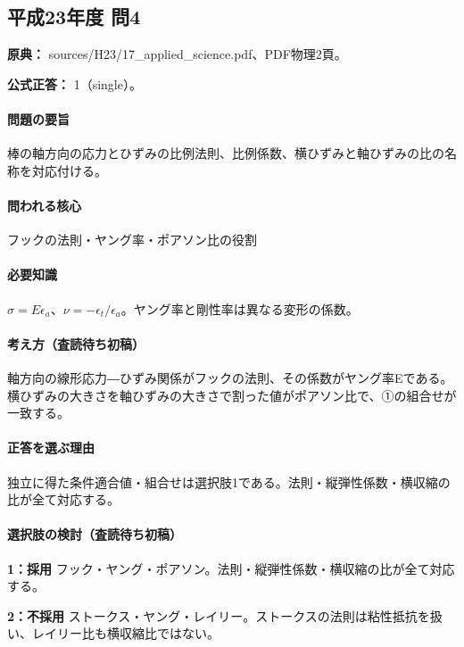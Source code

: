 \subsection{平成23年度 問4}
\label{q:h23-reg-applied-04}

\noindent\textbf{原典：} sources/H23/17\_applied\_science.pdf、PDF物理2頁。

\textbf{公式正答：} 1（single）。

\paragraph{問題の要旨} 棒の軸方向の応力とひずみの比例法則、比例係数、横ひずみと軸ひずみの比の名称を対応付ける。

\paragraph{問われる核心} フックの法則・ヤング率・ポアソン比の役割

\paragraph{必要知識} \(\sigma=E\epsilon_a\)、\(\nu=-\epsilon_t/\epsilon_a\)。ヤング率と剛性率は異なる変形の係数。

\paragraph{考え方（査読待ち初稿）} 軸方向の線形応力―ひずみ関係がフックの法則、その係数がヤング率Eである。横ひずみの大きさを軸ひずみの大きさで割った値がポアソン比で、①の組合せが一致する。

\paragraph{正答を選ぶ理由} 独立に得た条件適合値・組合せは選択肢1である。法則・縦弾性係数・横収縮の比が全て対応する。

\paragraph{選択肢の検討（査読待ち初稿）}

\noindent\textbf{1：採用} フック・ヤング・ポアソン。法則・縦弾性係数・横収縮の比が全て対応する。\par

\noindent\textbf{2：不採用} ストークス・ヤング・レイリー。ストークスの法則は粘性抵抗を扱い、レイリー比も横収縮比ではない。\par

